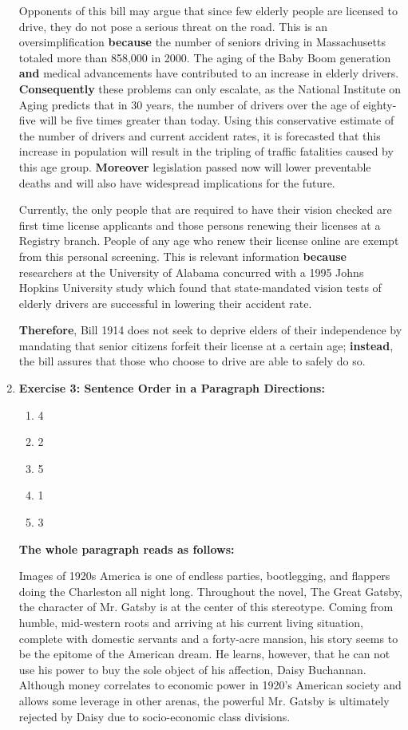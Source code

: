 \begin{enumerate}
Opponents of this bill may argue that since few elderly people are licensed to drive, they do not pose a serious threat on the road. This is an oversimplification \textbf{because} the number of seniors driving in Massachusetts totaled more than 858,000 in 2000. The aging of the Baby Boom generation \textbf{and} medical advancements have contributed to an increase in elderly drivers. \textbf{Consequently} these problems can only escalate, as the National Institute on Aging predicts that in 30 years, the number of drivers over the age of eighty-five will be five times greater than today. Using this conservative estimate of the number of drivers and current accident rates, it is forecasted that this increase in population will result in the tripling of traffic fatalities caused by this age group. \textbf{Moreover} legislation passed now will lower preventable deaths and will also have widespread implications for the future. 
 
Currently, the only people that are required to have their vision checked are first time license applicants and those persons renewing their licenses at a Registry branch. People of any age who renew their license online are exempt from this personal screening. This is relevant information \textbf{because} researchers at the University of Alabama concurred with a 1995 Johns Hopkins University study which found that state-mandated vision tests of elderly drivers are successful in lowering their accident rate.

\textbf{Therefore}, Bill 1914 does not seek to deprive elders of their independence by mandating that senior citizens forfeit their license at a certain age; \textbf{instead}, the bill assures that those who choose to drive are able to safely do so.   

\item \textbf{Exercise 3: Sentence Order in a Paragraph Directions:}

\begin{enumerate}
\item 4
\item 2
\item 5
\item 1
\item 3
\end{enumerate}

\textbf{The whole paragraph reads as follows:}

Images of 1920s America is one of endless parties, bootlegging, and flappers doing the Charleston all night long. Throughout the novel, The Great Gatsby, the character of Mr. Gatsby is at the center of this stereotype. Coming from humble, mid-western roots and arriving at his current living situation, complete with domestic servants and a forty-acre mansion, his story seems to be the epitome of the American dream. He learns, however, that he can not use his power to buy the sole object of his affection, Daisy Buchannan. Although money correlates to economic power in 1920's American society and allows some leverage in other arenas, the powerful Mr. Gatsby is ultimately rejected by Daisy due to socio-economic class divisions.


\end{enumerate}
